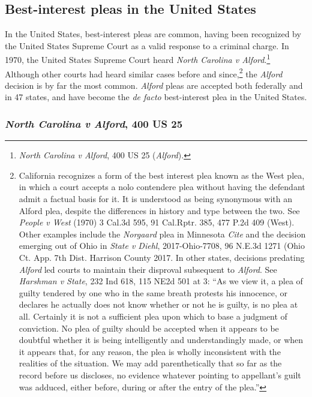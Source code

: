 \subsection{Best-interest pleas in the United States}

In the United States, best-interest pleas are common, having been recognized by the United States Supreme Court as a valid response to a criminal charge. In 1970, the United States Supreme Court heard \textit{North Carolina v Alford}.\footnote{\textit{North Carolina v Alford}, 400 US 25 (\textit{Alford}).} Although other courts had heard similar cases before and since,\footnote{California recognizes a form of the best interest plea known as the West plea, in which a court accepts a nolo contendere plea without having the defendant admit a factual basis for it. It is understood as being synonymous with an Alford plea, despite the differences in history and type between the two. See \textit{People v West} (1970) 3 Cal.3d 595, 91 Cal.Rptr. 385, 477 P.2d 409 (West). Other examples include the \textit{Norgaard} plea in Minnesota \textit{Cite} and the decision emerging out of Ohio in \textit{State v Diehl}, 2017-Ohio-7708, 96 N.E.3d 1271 (Ohio Ct. App. 7th Dist. Harrison County 2017. In other states, decisions predating \textit{Alford} led courts to maintain their disproval subsequent to \textit{Alford}. See \textit{Harshman v State}, 232 Ind 618, 115 NE2d 501 at 3: ``As we view it, a plea of guilty tendered by one who in the same breath protests his innocence, or declares he actually does not know whether or not he is guilty, is no plea at all. Certainly it is not a sufficient plea upon which to base a judgment of conviction. No plea of guilty should be accepted when it appears to be doubtful whether it is being intelligently and understandingly made, or when it appears that, for any reason, the plea is wholly inconsistent with the realities of the situation. We may add parenthetically that so far as the record before us discloses, no evidence whatever pointing to appellant's guilt was adduced, either before, during or after the entry of the plea.''} the \textit{Alford} decision is by far the most common. \textit{Alford} pleas are accepted both federally and in 47 states, and have become the \textit{de facto} best-interest plea in the United States.

\subsubsection{\textit{North Carolina v Alford}, 400 US 25}

